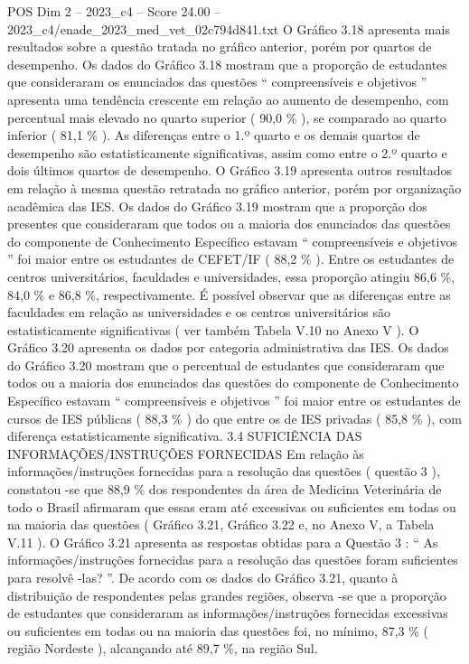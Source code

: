 \begin{textsample}{POS Dim 2 – 2023\_c4 – Score 24.00 – 2023\_c4/enade\_2023\_med\_vet\_02c794d841.txt}
O Gráfico 3.18 apresenta mais resultados sobre a questão tratada no gráfico anterior, porém por quartos de desempenho.
Os dados do Gráfico 3.18 mostram que a proporção de estudantes que consideraram os enunciados das questões “ compreensíveis e objetivos ” apresenta uma tendência crescente em relação ao aumento de desempenho, com percentual mais elevado no quarto superior ( 90,0 \% ), se comparado ao quarto inferior ( 81,1 \% ).
As diferenças entre o 1.º quarto e os demais quartos de desempenho são estatisticamente significativas, assim como entre o 2.º quarto e dois últimos quartos de desempenho.
O Gráfico 3.19 apresenta outros resultados em relação à mesma questão retratada no gráfico anterior, porém por organização acadêmica das IES.
Os dados do Gráfico 3.19 mostram que a proporção dos presentes que consideraram que todos ou a maioria dos enunciados das questões do componente de Conhecimento Específico estavam “ compreensíveis e objetivos ” foi maior entre os estudantes de CEFET/IF ( 88,2 \% ).
Entre os estudantes de centros universitários, faculdades e universidades, essa proporção atingiu 86,6 \%, 84,0 \% e 86,8 \%, respectivamente.
É possível observar que as diferenças entre as faculdades em relação as universidades e os centros universitários são estatisticamente significativas ( ver também Tabela V.10 no Anexo V ).
O Gráfico 3.20 apresenta os dados por categoria administrativa das IES.
Os dados do Gráfico 3.20 mostram que o percentual de estudantes que consideraram que todos ou a maioria dos enunciados das questões do componente de Conhecimento Específico estavam “ compreensíveis e objetivos ” foi maior entre os estudantes de cursos de IES públicas ( 88,3 \% ) do que entre os de IES privadas ( 85,8 \% ), com diferença estatisticamente significativa. 3.4 SUFICIÊNCIA DAS INFORMAÇÕES/INSTRUÇÕES FORNECIDAS Em relação às informações/instruções fornecidas para a resolução das questões ( questão 3 ), constatou -se que 88,9 \% dos respondentes da área de Medicina Veterinária de todo o Brasil afirmaram que essas eram até excessivas ou suficientes em todas ou na maioria das questões ( Gráfico 3.21, Gráfico 3.22 e, no Anexo V, a Tabela V.11 ).
O Gráfico 3.21 apresenta as respostas obtidas para a Questão 3 : “ As informações/instruções fornecidas para a resolução das questões foram suficientes para resolvê -las? ”.
De acordo com os dados do Gráfico 3.21, quanto à distribuição de respondentes pelas grandes regiões, observa -se que a proporção de estudantes que consideraram as informações/instruções fornecidas excessivas ou suficientes em todas ou na maioria das questões foi, no mínimo, 87,3 \% ( região Nordeste ), alcançando até 89,7 \%, na região Sul.

\end{textsample}
